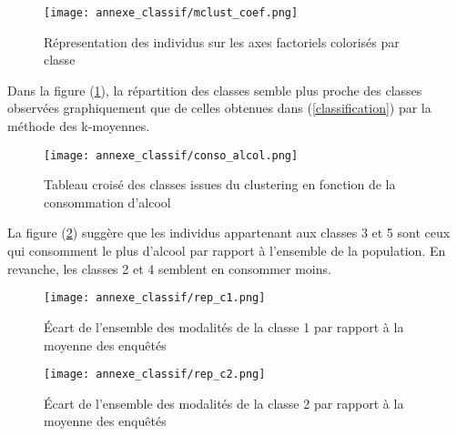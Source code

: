 \documentclass{article}
\begin{document}
\begin{figure}[H]
  \centering
  \texttt{[image: annexe\_classif/mclust\_coef.png]} 
  \caption{Répresentation des individus sur les axes factoriels colorisés par classe}
  \label{fig:annexe12}
\end{figure}
Dans la figure (\ref{fig:annexe12}), la répartition des classes semble plus proche des classes observées graphiquement que de celles obtenues dans (\ref{classification}) par la méthode des k-moyennes.
\begin{figure}[H]
  \centering
  \texttt{[image: annexe\_classif/conso\_alcol.png]} 
  \caption{Tableau croisé des classes issues du clustering en fonction de la consommation d'alcool}
  \label{fig:annexe13}
\end{figure}
La figure (\ref{fig:annexe13}) suggère que les individus appartenant aux classes 3 et 5 sont ceux qui consomment le plus d'alcool par rapport à l'ensemble de la population. En revanche, les classes 2 et 4 semblent en consommer moins.
\begin{figure}[H]
  \centering
  \texttt{[image: annexe\_classif/rep\_c1.png]} 
  \caption{Écart de l’ensemble des modalités de la classe 1 par rapport à la moyenne des enquêtés}
  \label{fig:annexe21}
\end{figure}
\begin{figure}[H]
  \centering
  \texttt{[image: annexe\_classif/rep\_c2.png]} 
  \caption{Écart de l’ensemble des modalités de la classe 2 par rapport à la moyenne des enquêtés}
  \label{fig:annexe22}
\end{figure}
\end{document}
